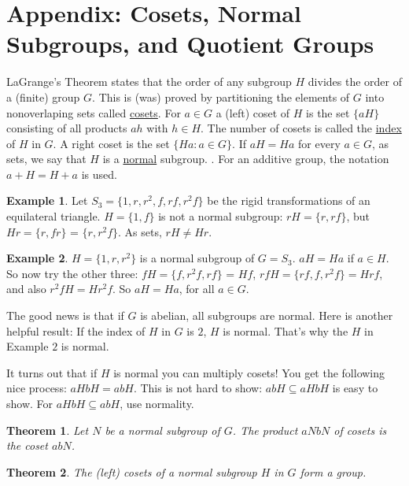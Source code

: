 \documentclass[12pt]{book}
\newtheorem{theorem}{Theorem}
\theoremstyle{definition}
\newtheorem{example}{Example}
\begin{document}
\section{Appendix: Cosets, Normal Subgroups, and Quotient Groups}


   LaGrange's Theorem states that the order of any subgroup $H$ divides the order of a (finite) group $G$. This is (was) proved by partitioning the elements of $G$
into nonoverlaping sets called \underline {cosets}. For $a\in G$ a (left) coset of $H$ is the set $\{aH\}$ consisting of all products $ah$ with $h\in H$. The number of cosets is called the \underline{index} of $H$ in $G$. A right coset is the set $\{Ha: a\in G\}$. If $aH = Ha$ for every $a\in G$, as sets, we say that $H$ is a \underline{normal} subgroup.       . For an additive group, the notation $a+H = H+a$ is used.

\begin{example}
Let $S_3 =\{1, r, r^2, f, rf, r^2f\}$ be the rigid transformations of an equilateral triangle. $H = \{1, f\}$ is not a normal subgroup: $rH = \{r, rf\}$, but $Hr = \{r, fr\}$ = $\{r, r^2f\}$. As sets, $rH \neq Hr$.
\end{example}

\begin{example} $H = \{1, r, r^2\}$   is a normal subgroup of $G=S_3$. $aH = Ha$ if $a\in H$. So now try the other three: $fH = \{f, r^2f, rf\}$ = $Hf$, $rfH = \{rf, f, r^2f\} = Hrf$, and also $r^2fH = Hr^2f$. So $aH = Ha$, for all $a\in G$.
\end{example}


The good news is that if $G$ is abelian, all subgroups are normal. Here is another helpful result: If the index of $H$ in $G$ is $2$, $H$ is normal. That's why the $H$ in Example $2$ is normal.

It turns out that if $H$ is normal you can multiply cosets! You get the following nice process: $aHbH = abH$. This is not hard to show: $abH\subseteq aHbH$ is easy to show. For $aHbH\subseteq abH$, use normality.

\begin{theorem} Let $N$ be a normal subgroup of $G$. The product  $aNbN$ of cosets is the coset $abN$.
\end{theorem}

\begin{theorem}
The (left) cosets of a normal subgroup $H$ in $G$ form a group.
\end{theorem}
\end{document}
